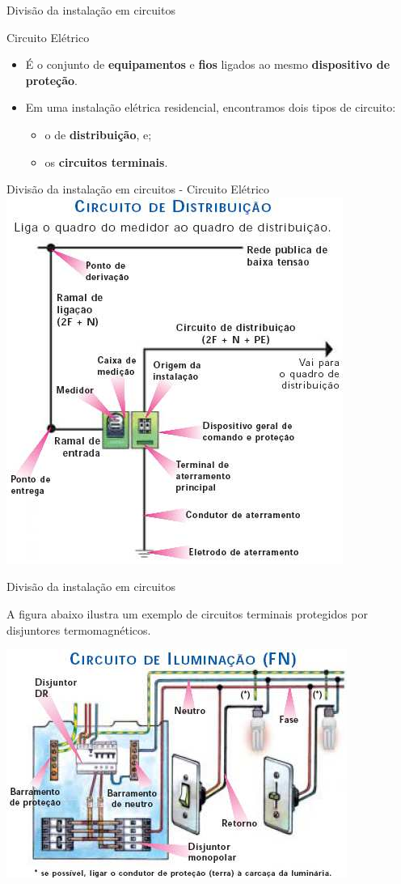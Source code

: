 \begin{frame}{Divisão da instalação em circuitos}
	\begin{block}{Circuito Elétrico}
		\begin{itemize}
			\item É o conjunto de \textbf{equipamentos} e \textbf{fios} ligados ao mesmo \textbf{dispositivo de proteção}.
			\item Em uma instalação elétrica residencial, encontramos dois tipos de circuito:
			      \begin{itemize}
				      \item\normalsize o de \textbf{distribuição}, e;
				      \item\normalsize os \textbf{circuitos terminais}.
			      \end{itemize}
		\end{itemize}
	\end{block}
\end{frame}


\begin{frame}{Divisão da instalação em circuitos - Circuito Elétrico}
	\centering
	\includegraphics[width=0.6\linewidth]{Figuras/Ch05/fig7}
\end{frame}


\begin{frame}{Divisão da instalação em circuitos}
	\begin{block}{}
		A figura abaixo ilustra um exemplo de circuitos terminais protegidos por disjuntores	termomagnéticos.
	\end{block}

	\centering
	\includegraphics[width=0.7\linewidth]{Figuras/Ch05/fig8}
\end{frame}


